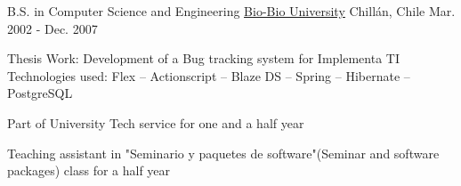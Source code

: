 

\begin{cventries}

  \cventry
    {B.S. in Computer Science and Engineering} %
    {\href{http://www.ubiobio.cl/}{\underline{Bio-Bio University}}} %
    {Chillán, Chile} %
    {Mar. 2002 - Dec. 2007} %
    {
      \begin{cvitems} %
        \item {Thesis Work: Development of a Bug tracking system for Implementa TI\\
               Technologies used: Flex – Actionscript – Blaze DS – Spring – Hibernate – PostgreSQL}
        \item {Part of University Tech service for one and a half year}
        \item {Teaching assistant in "Seminario y paquetes de software"(Seminar and software packages) class for a half year}
      \end{cvitems}
    }

\end{cventries}
